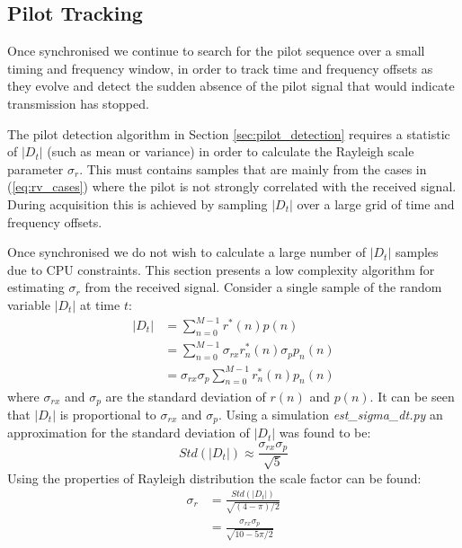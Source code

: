\documentclass{article}
\begin{document}
\subsection{Pilot Tracking}

Once synchronised we continue to search for the pilot sequence over a small timing and frequency window, in order to track time and frequency offsets as they evolve and detect the sudden absence of the pilot signal that would indicate transmission has stopped.

The pilot detection algorithm in Section \ref{sec:pilot_detection} requires a statistic of $|D_t|$ (such as mean or variance) in order to calculate the Rayleigh scale parameter $\sigma_r$.  This must contains samples that are mainly from the cases in (\ref{eq:rv_cases}) where the pilot is not strongly correlated with the received signal.  During acquisition this is achieved by sampling $|D_t|$ over a large grid of time and frequency offsets.

Once synchronised we do not wish to calculate a large number of $|D_t|$ samples due to CPU constraints.  This section presents a low complexity algorithm for estimating $\sigma_r$ from the received signal.  Consider a single sample of the random variable $|D_t|$ at time $t$:
\begin{equation}
\begin{split}
|D_t| &= \sum_{n=0}^{M-1} r^*(n)p(n) \\
      &= \sum_{n=0}^{M-1} \sigma_{rx}r_n^*(n)\sigma_p p_n(n) \\
      &= \sigma_{rx}\sigma_p\sum_{n=0}^{M-1}r_n^*(n)p_n(n)
\end{split}
\end{equation}
where $\sigma_{rx}$ and $\sigma_p$ are the standard deviation of $r(n)$ and $p(n)$.  It can be seen that $|D_t|$ is proportional to $\sigma_{rx}$ and $\sigma_p$.  Using a simulation \emph{est\_sigma\_dt.py} an approximation for the standard deviation of $|D_t|$ was found to be:
\begin{equation}
Std(|D_t|) \approx \frac{\sigma_{rx}\sigma_p}{\sqrt{5}}
\end{equation}
Using the properties of Rayleigh distribution the scale factor can be found:
\begin{equation}
\begin{split}
\sigma_r &= \frac{Std(|D_t|)}{\sqrt{(4-\pi)/2}} \\
         &= \frac{\sigma_{rx}\sigma_p}{\sqrt{10 - 5\pi/2}}
\end{split}
\end{equation}
\end{document}
